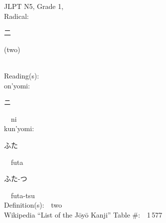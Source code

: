 \begin{multicols}{2}
{JLPT N5, Grade 1, \\Radical:\ \ {\begin{CJK}{UTF8}{min} 二 \end{CJK}} (two) } \\
Reading(s):\ \ \\
{\hspace*{1em}}on'yomi:\ \ \\
{\hspace*{2em}}{\begin{CJK}{UTF8}{min} ニ \end{CJK}}\ \ ni\ \ \\
{\hspace*{1em}}kun'yomi:\ \ \\
{\hspace*{2em}}{\begin{CJK}{UTF8}{min} ふた \end{CJK}}\ \ futa\ \ \\
{\hspace*{2em}}{\begin{CJK}{UTF8}{min} ふた-つ \end{CJK}}\ \ futa-tsu\ \ \\
Definition(s):\ \ two \\
Wikipedia ``List of the J\=oy\=o Kanji'' Table \#:\ \ 1\,577 \\
\ \ \\
\end{multicols}



